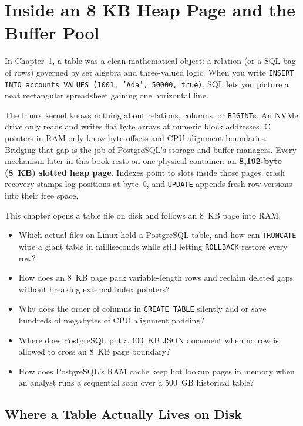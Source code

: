 \chapter{Inside an 8 KB Heap Page and the Buffer Pool}
\label{ch:heap-pages}

In Chapter~1, a table was a clean mathematical object: a relation (or a SQL bag of rows) governed by set algebra and three-valued logic. When you write \texttt{INSERT INTO accounts VALUES (1001, 'Ada', 50000, true)}, SQL lets you picture a neat rectangular spreadsheet gaining one horizontal line.

The Linux kernel knows nothing about relations, columns, or \texttt{BIGINT}s. An NVMe drive only reads and writes flat byte arrays at numeric block addresses. C pointers in RAM only know byte offsets and CPU alignment boundaries. Bridging that gap is the job of PostgreSQL's storage and buffer managers. Every mechanism later in this book rests on one physical container: an \textbf{8,192-byte (8~KB) slotted heap page}. Indexes point to slots inside those pages, crash recovery stamps log positions at byte~0, and \texttt{UPDATE} appends fresh row versions into their free space.

\begin{focusbox}
This chapter opens a table file on disk and follows an 8~KB page into RAM.
\begin{itemize}
  \item Which actual files on Linux hold a PostgreSQL table, and how can \texttt{TRUNCATE} wipe a giant table in milliseconds while still letting \texttt{ROLLBACK} restore every row?
  \item How does an 8~KB page pack variable-length rows and reclaim deleted gaps without breaking external index pointers?
  \item Why does the order of columns in \texttt{CREATE TABLE} silently add or save hundreds of megabytes of CPU alignment padding?
  \item Where does PostgreSQL put a 400~KB JSON document when no row is allowed to cross an 8~KB page boundary?
  \item How does PostgreSQL's RAM cache keep hot lookup pages in memory when an analyst runs a sequential scan over a 500~GB historical table?
\end{itemize}
\end{focusbox}

\section{Where a Table Actually Lives on Disk}
\label{sec:ch02-files-and-forks}

